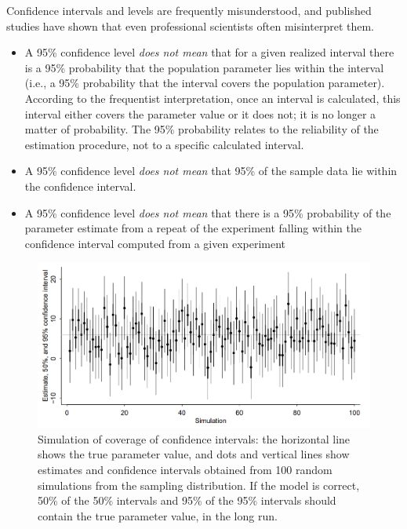 Confidence intervals and levels are frequently misunderstood, 
and published studies have shown that even professional scientists often misinterpret them.
\begin{itemize}
\item A 95\% confidence level \emph{does not mean} that for a given realized interval there is a 95\% probability 
that the population parameter lies within the interval (i.e., a 95\% probability that the interval covers the population parameter).
According to the frequentist interpretation, 
once an interval is calculated, 
this interval either covers the parameter value or it does not; 
it is no longer a matter of probability. 
The 95\% probability relates to the reliability of the estimation procedure, 
not to a specific calculated interval.
\item A 95\% confidence level \emph{does not mean} that 95\% of the sample data lie within the confidence interval.
\item A 95\% confidence level \emph{does not mean} that there is a 95\% probability of the parameter 
estimate from a repeat of the experiment falling within the confidence interval computed from a given experiment
\end{itemize}

\begin{figure}[h!]
\centering
\includegraphics[width=0.75\linewidth]{figure1.png}
\caption{%
Simulation of coverage of confidence intervals: the horizontal line shows the true parameter value,
and dots and vertical lines show estimates and confidence intervals obtained from 100 random simulations from
the sampling distribution. 
If the model is correct, 50\% of the 50\% intervals and 95\% of the 95\% intervals should
contain the true parameter value, in the long run.}
\label{fig:interval}
\end{figure}

